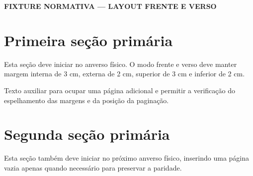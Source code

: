 \documentclass{ufctex}
\begin{document}
\pretextual
\begin{center}
  \textbf{FIXTURE NORMATIVA --- LAYOUT FRENTE E VERSO}
\end{center}
\newpage

\textual

\section{Primeira seção primária}
Esta seção deve iniciar no anverso físico. O modo frente e verso deve manter margem interna de 3 cm, externa de 2 cm, superior de 3 cm e inferior de 2 cm.

\newpage
Texto auxiliar para ocupar uma página adicional e permitir a verificação do espelhamento das margens e da posição da paginação.

\section{Segunda seção primária}
Esta seção também deve iniciar no próximo anverso físico, inserindo uma página vazia apenas quando necessário para preservar a paridade.
\end{document}
